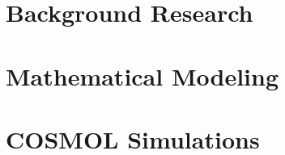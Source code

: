 \documentclass[]{article}
\begin{document}
\section{Background Research}

\section{Mathematical Modeling}

\section{COSMOL Simulations}
\end{document}
